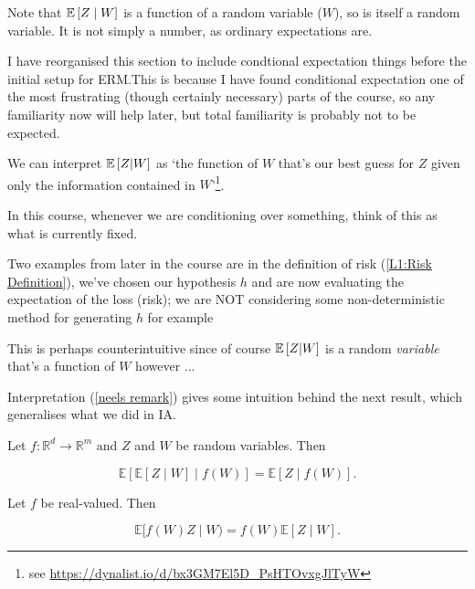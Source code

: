 \documentclass[11pt]{scrartcl}
\begin{document}
Note that $\mathbb{E} \left[ Z\mid W \right]$ is a function of a random variable ($W$), so is itself a random variable. It is not simply a number, as ordinary expectations are. 

\begin{remark}
I have reorganised this section to include condtional expectation things before the initial setup for ERM.This is because I have found conditional expectation one of the most frustrating (though certainly necessary) parts of the course, so any familiarity now will help later, but total familiarity is probably not to be expected.
\end{remark}

\begin{remark}We can interpret $\mathbb{E} \left[ Z|W \right]$ as `the function of $W$ that's our best guess for $Z$ given only the information contained in $W$'\footnote{see \url{https://dynalist.io/d/bx3GM7El5D_PsHTOvxgJlTyW}}.
\label{neels remark}
\end{remark} 

\begin{remark}
In this course, whenever we are conditioning over something, think of this as what is currently fixed.

Two examples from later in the course are in the definition of risk (\ref{L1:Risk Definition}), we've chosen our hypothesis $h$ and are now evaluating the expectation of the loss (risk); we are NOT considering some non-deterministic method for generating $h$ for example

This is perhaps counterintuitive since of course $\mathbb{E} \left[ Z|W \right]$ is a random \textit{variable} that's a function of $W$ however ...
\end{remark}

Interpretation (\ref{neels remark}) gives some intuition behind the next result, which generalises what we did in IA.

\begin{theorem}
Let $f : \mathbb{R}^d \rightarrow \mathbb{R}^m$ and $Z$ and $W$ be random variables. Then 

\begin{equation}
\mathbb{E}[\mathbb{E}[Z\mid W]\mid f(W)] = \mathbb{E}[Z\mid f(W)].
\end{equation}
\end{theorem}

\begin{theorem}
Let $f$ be real-valued. Then

\begin{equation}
    \mathbb{E}[f(W)Z\mid W) = f(W)\mathbb{E}[Z\mid W].
\end{equation}
\label{L1: Taking out}
\end{theorem}
\end{document}
